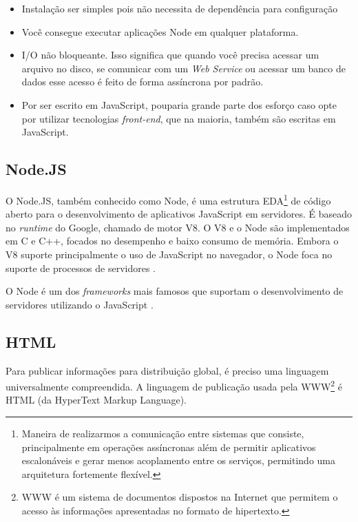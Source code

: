 \begin{itemize}
    \item Instalação ser simples pois não necessita de dependência para configuração
    \item Você consegue executar aplicações Node em qualquer plataforma.
    \item I/O não bloqueante. Isso significa que quando você precisa acessar um arquivo no disco, se comunicar com um \textit{Web Service} ou acessar um banco de dados esse acesso é feito de forma assíncrona por padrão.
    \item Por ser escrito em JavaScript, pouparia grande parte dos esforço caso opte por utilizar tecnologias \textit{front-end}, que na maioria, também são escritas em JavaScript.
\end{itemize}
 

\subsection{Node.JS}

O Node.JS, também conhecido como Node, é uma estrutura EDA\footnote{Maneira de realizarmos a comunicação entre sistemas que consiste, principalmente em operações assíncronas além de permitir aplicativos escalonáveis e gerar menos acoplamento entre os serviços, permitindo uma arquitetura fortemente flexível.} de código aberto para o desenvolvimento de aplicativos JavaScript em servidores. É baseado no \textit{runtime} do Google, chamado de motor V8. O V8 e o Node são implementados em C e C++, focados no desempenho e baixo consumo de memória. Embora o V8 suporte principalmente o uso de JavaScript no navegador, o Node foca no suporte de processos de servidores \cite{Tilkov2010}.

O Node é um dos \textit{frameworks} mais famosos que suportam o desenvolvimento de servidores utilizando o JavaScript \cite{Tilkov2010}.


\subsection{HTML}

Para publicar informações para distribuição global, é preciso uma linguagem universalmente compreendida. A linguagem de publicação usada pela WWW\footnote{WWW é um sistema de documentos dispostos na Internet que permitem o acesso às informações apresentadas no formato de hipertexto.} é HTML (da HyperText Markup Language).\citeauthor{html}

